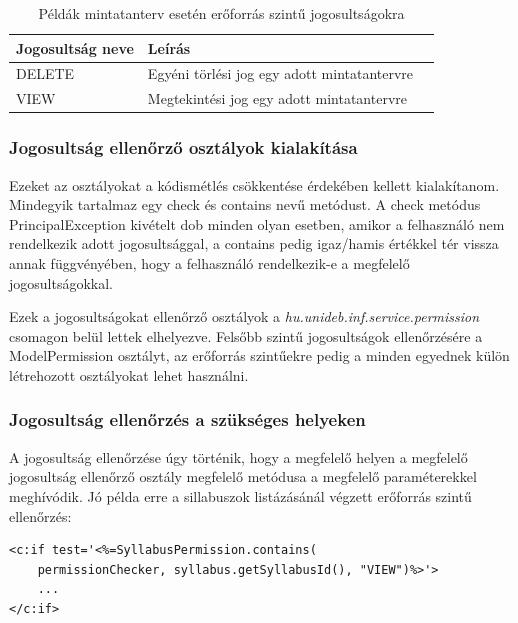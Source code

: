 \documentclass[hidelinks, 12pt, a4paper]{report}
\begin{document}
\begin{table}[H]
	\caption{Példák mintatanterv esetén erőforrás szintű jogosultságokra}
	\centering
	\begin{tabular}{| l | l | l |}
	\hline
	\textbf{Jogosultság neve} & \textbf{Leírás} \\
	\hline
	DELETE & Egyéni törlési jog egy adott mintatantervre \\
	\hline
	VIEW & Megtekintési jog egy adott mintatantervre \\
	\hline
\end{tabular}
\end{table}

\subsubsection{Jogosultság ellenőrző osztályok kialakítása}

Ezeket az osztályokat a kódismétlés csökkentése érdekében kellett kialakítanom. Mindegyik tartalmaz egy check és contains nevű metódust. A check metódus PrincipalException kivételt dob minden olyan esetben, amikor a felhasználó nem rendelkezik adott jogosultsággal, a contains pedig igaz/hamis értékkel tér vissza annak függvényében, hogy a felhasználó rendelkezik-e a megfelelő jogosultságokkal.

Ezek a jogosultságokat ellenőrző osztályok a \emph{hu.unideb.inf.service.permission} csomagon belül lettek elhelyezve. Felsőbb szintű jogosultságok ellenőrzésére a ModelPermission osztályt, az erőforrás szintűekre pedig a minden egyednek külön létrehozott osztályokat lehet használni.

\subsubsection{Jogosultság ellenőrzés a szükséges helyeken}

A jogosultság ellenőrzése úgy történik, hogy a megfelelő helyen a megfelelő jogosultság ellenőrző osztály megfelelő metódusa a megfelelő paraméterekkel meghívódik. Jó példa erre a sillabuszok listázásánál végzett erőforrás szintű ellenőrzés:

\begin{minipage}{\linewidth}
\begin{lstlisting}[basicstyle=\small]
<c:if test='<%=SyllabusPermission.contains(
	permissionChecker, syllabus.getSyllabusId(), "VIEW")%>'>
	...
</c:if>
\end{lstlisting}
\end{minipage}
\end{document}
